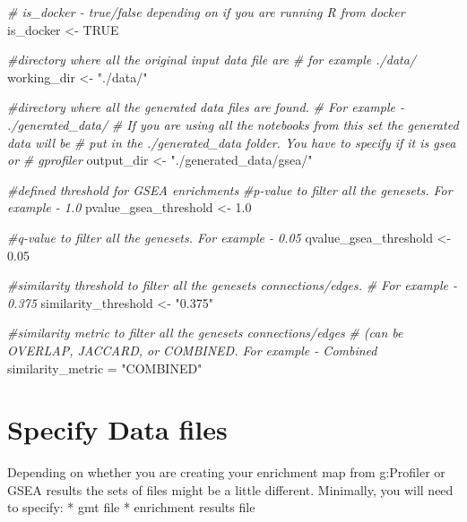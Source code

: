 \documentclass[
]{book}
\newenvironment{Shaded}{\begin{snugshade}}{\end{snugshade}}
\newcommand{\CommentTok}[1]{\textcolor[rgb]{0.56,0.35,0.01}{\textit{#1}}}
\newcommand{\ConstantTok}[1]{\textcolor[rgb]{0.00,0.00,0.00}{#1}}
\newcommand{\FloatTok}[1]{\textcolor[rgb]{0.00,0.00,0.81}{#1}}
\newcommand{\NormalTok}[1]{#1}
\newcommand{\OtherTok}[1]{\textcolor[rgb]{0.56,0.35,0.01}{#1}}
\newcommand{\StringTok}[1]{\textcolor[rgb]{0.31,0.60,0.02}{#1}}
\begin{document}
\begin{Shaded}
\begin{Highlighting}[]
\CommentTok{\# is\_docker {-} true/false depending on if you are running R from docker}
\NormalTok{is\_docker }\OtherTok{\textless{}{-}} \ConstantTok{TRUE}

\CommentTok{\#directory where all the original input data file are}
\CommentTok{\# for example ./data/}
\NormalTok{working\_dir }\OtherTok{\textless{}{-}} \StringTok{"./data/"}


\CommentTok{\#directory where all the generated data files are found.}
\CommentTok{\# For example {-} ./generated\_data/}
\CommentTok{\# If you are using all the notebooks from this set the generated data will be}
\CommentTok{\# put in the ./generated\_data folder.  You have to specify if it is gsea or }
\CommentTok{\# gprofiler}
\NormalTok{output\_dir }\OtherTok{\textless{}{-}} \StringTok{"./generated\_data/gsea/"}


\CommentTok{\#defined threshold for GSEA enrichments }
\CommentTok{\#p{-}value to filter all the genesets.  For example {-}   1.0}
\NormalTok{pvalue\_gsea\_threshold }\OtherTok{\textless{}{-}} \FloatTok{1.0}

\CommentTok{\#q{-}value to filter all the genesets.  For example {-}   0.05}
\NormalTok{qvalue\_gsea\_threshold }\OtherTok{\textless{}{-}} \FloatTok{0.05}

\CommentTok{\#similarity threshold to filter all the genesets connections/edges.  }
\CommentTok{\# For example {-}   0.375}
\NormalTok{similarity\_threshold }\OtherTok{\textless{}{-}} \StringTok{"0.375"}

\CommentTok{\#similarity metric to filter all the genesets connections/edges }
\CommentTok{\# (can be OVERLAP, JACCARD, or COMBINED.   For example {-}   Combined}
\NormalTok{similarity\_metric }\OtherTok{=} \StringTok{"COMBINED"}
\end{Highlighting}
\end{Shaded}

\hypertarget{specify-data-files-1}{%
\section{Specify Data files}\label{specify-data-files-1}}

Depending on whether you are creating your enrichment map from g:Profiler or GSEA results the sets of files might be a little different. Minimally, you will need to specify:
* gmt file
* enrichment results file
\end{document}

